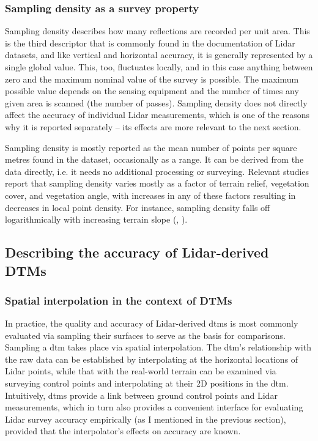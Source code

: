 \subsubsection{Sampling density as a survey property}

Sampling density describes how many reflections are recorded per unit area. This is the third descriptor that is commonly found in the documentation of Lidar datasets, and like vertical and horizontal accuracy, it is generally represented by a single global value. This, too, fluctuates locally, and in this case anything between zero and the maximum nominal value of the survey is possible. The maximum possible value depends on the sensing equipment and the number of times any given area is scanned (the number of passes). Sampling density does not directly affect the accuracy of individual Lidar measurements, which is one of the reasons why it is reported separately – its effects are more relevant to the next section.

Sampling density is mostly reported as the mean number of points per square metres found in the dataset, occasionally as a range. It can be derived from the data directly, i.e. it needs no additional processing or surveying. Relevant studies report that sampling density varies mostly as a factor of terrain relief, vegetation cover, and vegetation angle, with increases in any of these factors resulting in decreases in local point density. For instance, sampling density falls off logarithmically with increasing terrain slope (\cite{peng_shih_2006}, \cite{chow_hodgson_2009}).

\subsection{Describing the accuracy of Lidar-derived DTMs}
\label{sub:lidaraccuracy_dem}

\subsubsection{Spatial interpolation in the context of DTMs}

In practice, the quality and accuracy of Lidar-derived \ac{dtm}s is most commonly evaluated via sampling their surfaces to serve as the basis for comparisons. Sampling a \ac{dtm} takes place via spatial interpolation. The \ac{dtm}'s relationship with the raw data can be established by interpolating at the horizontal locations of Lidar points, while that with the real-world terrain can be examined via surveying control points and interpolating at their 2D positions in the \ac{dtm}. Intuitively, \ac{dtm}s provide a link between ground control points and Lidar measurements, which in turn also provides a convenient interface for evaluating Lidar survey accuracy empirically (as I mentioned in the previous section), provided that the interpolator's effects on accuracy are known.

